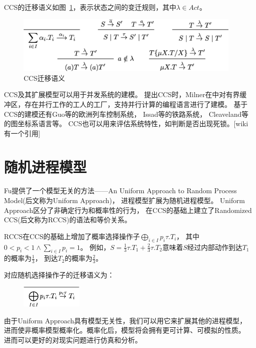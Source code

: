    CCS的迁移语义如图~\ref{fig_ccs}，表示状态之间的变迁规则，其中$\lambda \in Act$。

   \begin{figure}[!htbp]
    \small
    \centering
    \includegraphics[width=11cm]{../figure/ccs.png}
    \caption[]{CCS迁移语义}
     \label{fig_ccs}
 \end{figure}

   CCS及其扩展模型可以用于并发系统的建模。
   提出CCS时，Milner在\cite{2}中对有界缓冲区，存在并行工作的工人的工厂，支持并行计算的编程语言进行了建模。
   基于CCS的建模还有Guo等的欧洲列车控制系统\cite{16}，
   Issad等的铁路系统\cite{17}，
   Cleaveland等的图坐标系语言\cite{18}等。
   CCS也可以用来评估系统特性，如判断是否出现死锁。[wiki有一个引用]
   \section{随机进程模型}

   Fu提供了一个模型无关的方法——An Uniform Approach to Random Process Model(后文称为Uniform Approach)，
   进程模型扩展为随机进程模型。
   Uniform Approach区分了非确定行为和概率性的行为，
   在CCS的基础上建立了Randomized CCS(后文称为RCCS)的语法和等价关系。

   RCCS在CCS的基础上增加了概率选择操作子$\bigoplus_{i\in I}p_i\tau.T_i$，
   其中$0<p_i<1 \wedge \sum_{i\in I}p_i = 1$。
   例如，$S=\frac{1}{3}\tau.T_1+\frac{2}{3}\tau.T_2$意味着$S$经过内部动作到达$T_1$的概率为$\frac{1}{3}$，
   到达$T_2$的概率为$\frac{2}{3}$。

   对应随机选择操作子的迁移语义为：
   \begin{figure}[!htbp]
    \small
    \centering
    \includegraphics[width=3cm]{../figure/rccs.png}
     \label{fig_rccs}
 \end{figure}

   由于Uniform Approach具有模型无关性，我们可以用它来扩展其他的进程模型，
   进而使非概率模型概率化。概率化后，模型将会拥有更可计算、可模拟的性质。
   进而可以更好的对现实问题进行仿真和分析。

